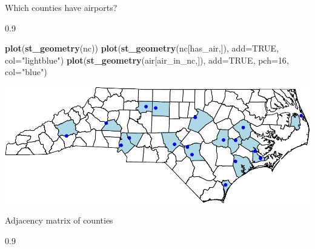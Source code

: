 \documentclass[11pt,ignorenonframetext,]{beamer}
\newenvironment{Shaded}{}{}
\newcommand{\KeywordTok}[1]{\textcolor[rgb]{0.00,0.44,0.13}{\textbf{#1}}}
\newcommand{\DataTypeTok}[1]{\textcolor[rgb]{0.56,0.13,0.00}{#1}}
\newcommand{\DecValTok}[1]{\textcolor[rgb]{0.25,0.63,0.44}{#1}}
\newcommand{\StringTok}[1]{\textcolor[rgb]{0.25,0.44,0.63}{#1}}
\newcommand{\OtherTok}[1]{\textcolor[rgb]{0.00,0.44,0.13}{#1}}
\newcommand{\OperatorTok}[1]{\textcolor[rgb]{0.40,0.40,0.40}{#1}}
\newcommand{\NormalTok}[1]{#1}
\let\oldShaded\Shaded
\let\endoldShaded\endShaded
\renewenvironment{Shaded}{\footnotesize\begin{spacing}{0.9}\oldShaded}{\endoldShaded\end{spacing}}
\begin{document}
\begin{frame}[fragile,t]{Which counties have airports?}
\end{frame}

\begin{frame}[fragile,t]{}

\begin{Shaded}
\begin{Highlighting}[]
\KeywordTok{plot}\NormalTok{(}\KeywordTok{st_geometry}\NormalTok{(nc))}
\KeywordTok{plot}\NormalTok{(}\KeywordTok{st_geometry}\NormalTok{(nc[has_air,]), }\DataTypeTok{add=}\OtherTok{TRUE}\NormalTok{, }\DataTypeTok{col=}\StringTok{"lightblue"}\NormalTok{)}
\KeywordTok{plot}\NormalTok{(}\KeywordTok{st_geometry}\NormalTok{(air[air_in_nc,]), }\DataTypeTok{add=}\OtherTok{TRUE}\NormalTok{, }\DataTypeTok{pch=}\DecValTok{16}\NormalTok{, }\DataTypeTok{col=}\StringTok{"blue"}\NormalTok{)}
\end{Highlighting}
\end{Shaded}

\begin{center}\includegraphics{Lec16_files/figure-beamer/unnamed-chunk-31-1} \end{center}

\end{frame}

\begin{frame}[fragile,t]{Adjacency matrix of counties}

\begin{Shaded}
\end{Shaded}

\end{frame}
\end{document}
